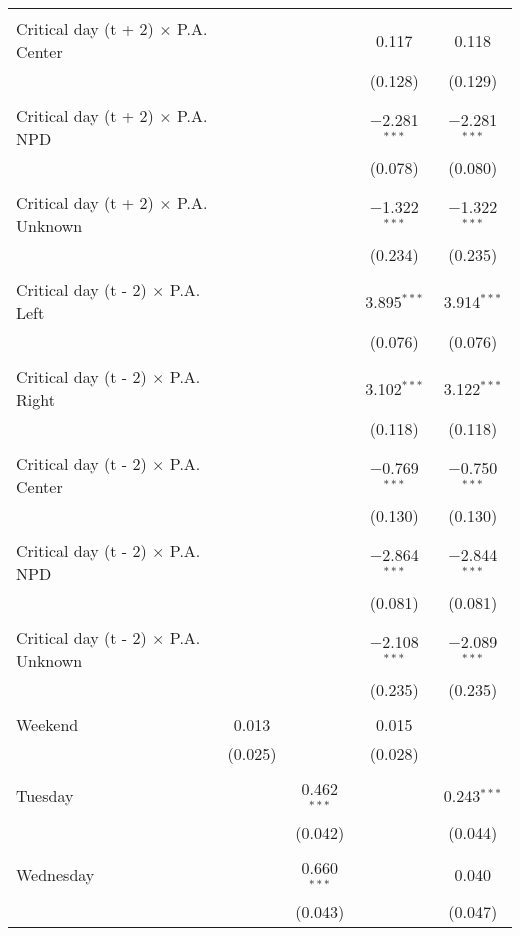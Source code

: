 \documentclass[
]{article}
\begin{document}
\begin{table}[!htbp]
{\begin{tabular}{@{\extracolsep{5pt}}lcccc}
  & & & & \\ 
 Critical day (t + 2) $\times$ P.A. Center &  &  & 0.117 & 0.118 \\ 
  &  &  & (0.128) & (0.129) \\ 
  & & & & \\ 
 Critical day (t + 2) $\times$ P.A. NPD &  &  & $-$2.281$^{***}$ & $-$2.281$^{***}$ \\ 
  &  &  & (0.078) & (0.080) \\ 
  & & & & \\ 
 Critical day (t + 2) $\times$ P.A. Unknown &  &  & $-$1.322$^{***}$ & $-$1.322$^{***}$ \\ 
  &  &  & (0.234) & (0.235) \\ 
  & & & & \\ 
 Critical day (t - 2) $\times$ P.A. Left &  &  & 3.895$^{***}$ & 3.914$^{***}$ \\ 
  &  &  & (0.076) & (0.076) \\ 
  & & & & \\ 
 Critical day (t - 2) $\times$ P.A. Right &  &  & 3.102$^{***}$ & 3.122$^{***}$ \\ 
  &  &  & (0.118) & (0.118) \\ 
  & & & & \\ 
 Critical day (t - 2) $\times$ P.A. Center &  &  & $-$0.769$^{***}$ & $-$0.750$^{***}$ \\ 
  &  &  & (0.130) & (0.130) \\ 
  & & & & \\ 
 Critical day (t - 2) $\times$ P.A. NPD &  &  & $-$2.864$^{***}$ & $-$2.844$^{***}$ \\ 
  &  &  & (0.081) & (0.081) \\ 
  & & & & \\ 
 Critical day (t - 2) $\times$ P.A. Unknown &  &  & $-$2.108$^{***}$ & $-$2.089$^{***}$ \\ 
  &  &  & (0.235) & (0.235) \\ 
  & & & & \\ 
 Weekend & 0.013 &  & 0.015 &  \\ 
  & (0.025) &  & (0.028) &  \\ 
  & & & & \\ 
 Tuesday &  & 0.462$^{***}$ &  & 0.243$^{***}$ \\ 
  &  & (0.042) &  & (0.044) \\ 
  & & & & \\ 
 Wednesday &  & 0.660$^{***}$ &  & 0.040 \\ 
  &  & (0.043) &  & (0.047) \\ 

\end{tabular}}
\end{table}
\end{document}
